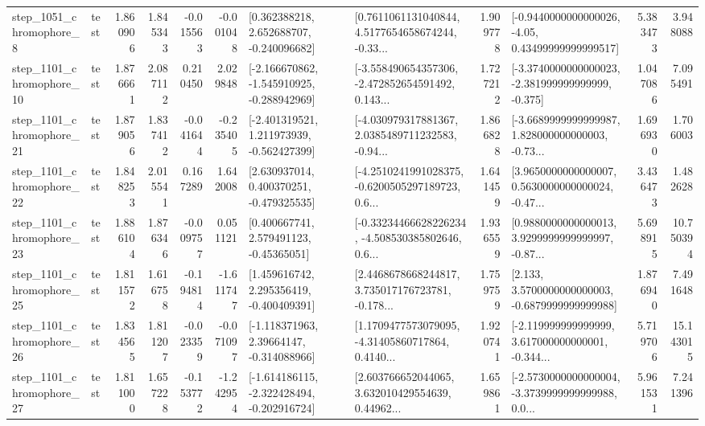 \begin{tabular}{llrrrrllrlrr}
  step\_1051\_chromophore\_8 &      test &      1.860906 &    1.845343 &     -0.015563 & -0.001048 &    [0.362388218, 2.652688707, -0.240096682] &  [0.7611061131040844, 4.5177654658674244, -0.33... &       1.909778 &  [-0.9440000000000026, -4.05, 0.43499999999999517] &            5.383473 &          3.948088 \\
 step\_1101\_chromophore\_10 &      test &      1.876661 &    2.087112 &      0.210450 &  2.029848 &  [-2.166670862, -1.545910925, -0.288942969] &  [-3.558490654357306, -2.472852654591492, 0.143... &       1.727212 &  [-3.3740000000000023, -2.381999999999999, -0.375] &            1.047086 &          7.095491 \\
 step\_1101\_chromophore\_21 &      test &      1.879056 &    1.837412 &     -0.041644 & -0.235405 &   [-2.401319521, 1.211973939, -0.562427399] &  [-4.030979317881367, 2.0385489711232583, -0.94... &       1.866828 &  [-3.6689999999999987, 1.828000000000003, -0.73... &            1.696930 &          1.706003 \\
 step\_1101\_chromophore\_22 &      test &      1.848253 &    2.015541 &      0.167289 &  1.642008 &    [2.630937014, 0.400370251, -0.479325535] &  [-4.2510241991028375, -0.6200505297189723, 0.6... &       1.641459 &  [3.9650000000000007, 0.5630000000000024, -0.47... &            3.436473 &          1.482628 \\
 step\_1101\_chromophore\_23 &      test &      1.886104 &    1.876346 &     -0.009757 &  0.051121 &     [0.400667741, 2.579491123, -0.45365051] &  [-0.33234466628226234, -4.508530385802646, 0.6... &       1.936559 &  [0.9880000000000013, 3.9299999999999997, -0.87... &            5.698915 &         10.750394 \\
 step\_1101\_chromophore\_25 &      test &      1.811572 &    1.616758 &     -0.194814 & -1.611747 &    [1.459616742, 2.295356419, -0.400409391] &  [2.4468678668244817, 3.735017176723781, -0.178... &       1.759759 &   [2.133, 3.5700000000000003, -0.6879999999999988] &            1.876940 &          7.491648 \\
 step\_1101\_chromophore\_26 &      test &      1.834565 &    1.811207 &     -0.023359 & -0.071097 &    [-1.118371963, 2.39664147, -0.314088966] &  [1.1709477573079095, -4.31405860717864, 0.4140... &       1.920741 &  [-2.119999999999999, 3.617000000000001, -0.344... &            5.719706 &         15.143015 \\
 step\_1101\_chromophore\_27 &      test &      1.811000 &    1.657228 &     -0.153772 & -1.242954 &  [-1.614186115, -2.322428494, -0.202916724] &  [2.603766652044065, 3.632010429554639, 0.44962... &       1.659861 &  [-2.5730000000000004, -3.3739999999999988, 0.0... &            5.961531 &          7.241396 \\

\end{tabular}
